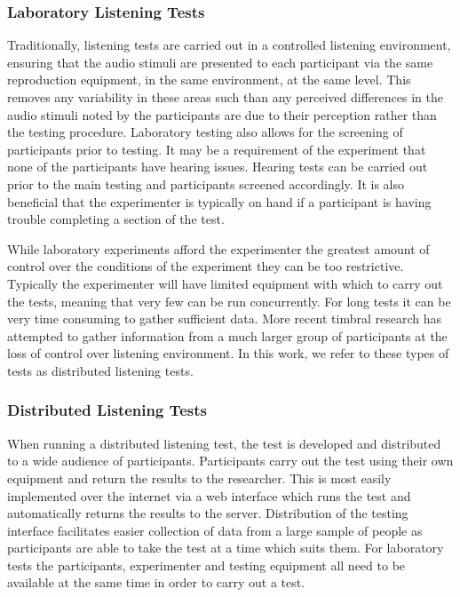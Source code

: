 		\subsubsection*{Laboratory Listening Tests}
			Traditionally, listening tests are carried out in a controlled listening environment, ensuring that
			the audio stimuli are presented to each participant via the same reproduction equipment, in the
			same environment, at the same level. This removes any variability in these areas such than any
			perceived differences in the audio stimuli noted by the participants are due to their perception
			rather than the testing procedure. Laboratory testing also allows for the screening of participants
			prior to testing. It may be a requirement of the experiment that none of the participants have
			hearing issues. Hearing tests can be carried out prior to the main testing and participants
			screened accordingly. It is also beneficial that the experimenter is typically on hand if a
			participant is having trouble completing a section of the test.

			While laboratory experiments afford the experimenter the greatest amount of control over the
			conditions of the experiment they can be too restrictive. Typically the experimenter will have
			limited equipment with which to carry out the tests, meaning that very few can be run concurrently.
			For long tests it can be very time consuming to gather sufficient data. More recent timbral
			research has attempted to gather information from a much larger group of participants at the loss
			of control over listening environment. In this work, we refer to these types of tests as
			distributed listening tests.

		\subsubsection*{Distributed Listening Tests}
			When running a distributed listening test, the test is developed and distributed to a wide audience
			of participants. Participants carry out the test using their own equipment and return the results
			to the researcher. This is most easily implemented over the internet via a web interface which runs
			the test and automatically returns the results to the server. Distribution of the testing interface
			facilitates easier collection of data from a large sample of people as participants are able to
			take the test at a time which suits them. For laboratory tests the participants, experimenter and
			testing equipment all need to be available at the same time in order to carry out a test.

